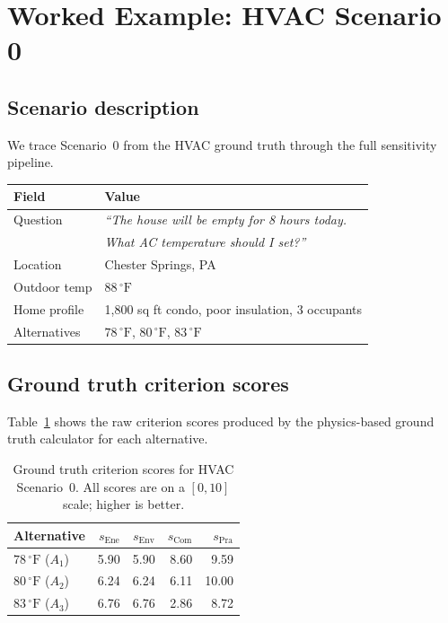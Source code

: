 \documentclass[11pt]{article}
\begin{document}
\section{Worked Example: HVAC Scenario 0}
\label{sec:example}

\subsection{Scenario description}

We trace Scenario~0 from the HVAC ground truth through the full sensitivity
pipeline.

\medskip
\begin{center}
\begin{tabular}{ll}
  \toprule
  Field & Value \\
  \midrule
  Question     & \textit{``The house will be empty for 8 hours today.}\\
               & \textit{\phantom{``}What AC temperature should I set?''} \\
  Location     & Chester Springs, PA \\
  Outdoor temp & $88\,^{\circ}\text{F}$ \\
  Home profile & 1,800 sq ft condo, poor insulation, 3 occupants \\
  Alternatives & $78\,^{\circ}\text{F}$, $80\,^{\circ}\text{F}$, $83\,^{\circ}\text{F}$ \\
  \bottomrule
\end{tabular}
\end{center}
\medskip

\subsection{Ground truth criterion scores}

Table~\ref{tab:gt-scores} shows the raw criterion scores produced by the
physics-based ground truth calculator for each alternative.

\begin{table}[ht]
\centering
\caption{Ground truth criterion scores for HVAC Scenario~0.
  All scores are on a $[0,10]$ scale; higher is better.}
\label{tab:gt-scores}
\begin{tabular}{lrrrr}
  \toprule
  Alternative & $s_{\text{Ene}}$ & $s_{\text{Env}}$ & $s_{\text{Com}}$ & $s_{\text{Pra}}$ \\
  \midrule
  $78\,^{\circ}\text{F}$ ($A_1$) & 5.90 & 5.90 & 8.60 & 9.59 \\
  $80\,^{\circ}\text{F}$ ($A_2$) & 6.24 & 6.24 & 6.11 & 10.00 \\
  $83\,^{\circ}\text{F}$ ($A_3$) & 6.76 & 6.76 & 2.86 & 8.72  \\
  \bottomrule
\end{tabular}
\end{table}
\end{document}
